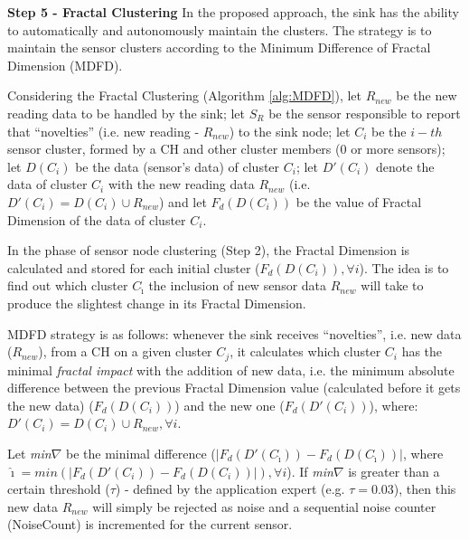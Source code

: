 \documentclass{acm_proc_article-sp}
\begin{document}
{\bf Step 5 - Fractal Clustering}
In the proposed approach, the sink has the ability to automatically and
autonomously maintain the clusters. The strategy is to maintain the sensor
clusters according to the Minimum Difference of Fractal Dimension (MDFD).
\vspace*{-.3cm}

Considering the Fractal Clustering (Algorithm \ref{alg:MDFD}), let $R_{new}$ be
the new reading data to be handled by the sink; let $S_{R}$ be the sensor
responsible to report that ``novelties'' (i.e. new reading - $R_{new}$) to the
sink node; let $C_i$ be the $i-th$ sensor cluster, formed by a CH and other
cluster members (0 or more sensors); let $D(C_i)$ be the data (sensor's data) of
cluster $C_i$; let $D'(C_i)$ denote the data of cluster $C_i$ with the new
reading data $R_{new}$ (i.e. $D'(C_i) = D(C_i) \cup R_{new}$) and let
$F_{d}(D(C_i))$ be the value of Fractal Dimension of the data of cluster $C_i$.
\vspace*{-.3cm}

In the phase of sensor node clustering (Step 2), the Fractal Dimension is 
calculated and stored for each initial cluster
($F_{d}(D(C_i)), \forall i$). The idea is to find out which cluster
$C_{\hat{\imath}}$ the inclusion of new sensor data $R_{new}$ will take to produce
the slightest change in its Fractal Dimension.
\vspace*{-.3cm}

MDFD strategy is as follows:
whenever the sink receives ``novelties'', i.e. new data ($R_{new}$), from a CH on
a given cluster $C_j$, it calculates which cluster $C_i$ has the minimal
\textit{fractal impact} with the addition of new data, i.e. the minimum absolute
difference between the previous Fractal Dimension value (calculated before it
gets the new data) ($F_d(D(C_i))$) and the new one ($F_d(D'(C_i))$), where:
$D'(C_i) = D(C_i) \cup R_{new}, \forall i$.
\vspace*{-.3cm}

Let {\it min}$\nabla$ be the minimal difference ($|F_d(D'(C_{\hat{\imath}})) -
F_d(D(C_{\hat{\imath}}))|$, where $\hat{\imath} = min(|F_d(D'(C_i)) - F_d(D(C_i))|),
\forall i$). If {\it min}$\nabla$ is greater than a certain threshold ($\tau$) -
defined by the application expert (e.g. $\tau = 0.03$), then this new data
$R_{new}$ will simply be rejected as noise and a sequential noise counter
(NoiseCount) is incremented for the current sensor.
\vspace*{-.3cm}
\end{document}
